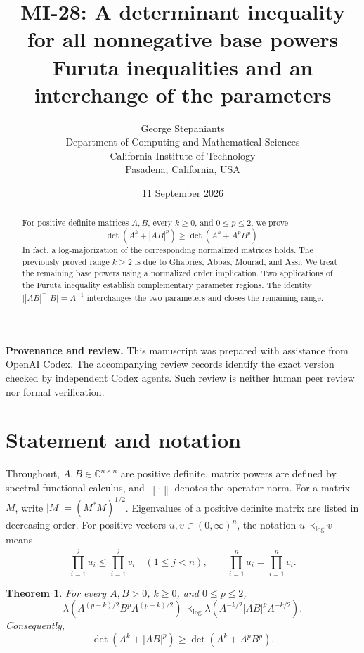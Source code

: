 \documentclass[11pt,a4paper]{article}
\title{\textbf{MI-28: A determinant inequality\\
for all nonnegative base powers}\\[0.4em]
\large Furuta inequalities and an interchange of the parameters}
\author{George Stepaniants\\[0.3em]
\small Department of Computing and Mathematical Sciences\\
\small California Institute of Technology\\
\small Pasadena, California, USA}
\date{11 September 2026}
\newtheorem{theorem}{Theorem}
\theoremstyle{remark}
\newcommand{\norm}[1]{\left\lVert #1\right\rVert}
\newcommand{\lm}{\prec_{\log}}
\newcommand{\C}{\mathbb C}
\begin{document}
\maketitle

\begin{abstract}
For positive definite matrices \(A,B\), every \(k\ge0\), and
\(0\le p\le2\), we prove
\[
 \det(A^k+|AB|^p)\ge\det(A^k+A^pB^p).
\]
In fact, a log-majorization of the corresponding normalized matrices
holds. The previously proved range \(k\ge2\) is due to
Ghabries, Abbas, Mourad, and Assi. We treat the remaining base powers
using a normalized order implication. Two applications of the Furuta
inequality establish complementary parameter regions. The identity
\(\lvert |AB|^{-1}B\rvert=A^{-1}\) interchanges the two parameters
and closes the remaining range.
\end{abstract}

\noindent\textbf{Provenance and review.}
This manuscript was prepared with assistance from OpenAI Codex.
The accompanying review records identify the exact version checked
by independent Codex agents. Such review is neither human peer review
nor formal verification.

\section{Statement and notation}

Throughout, \(A,B\in\C^{n\times n}\) are positive definite,
matrix powers are defined by spectral functional calculus, and
\(\norm{\cdot}\) denotes the operator norm.
For a matrix \(M\), write \(|M|=(M^*M)^{1/2}\).
Eigenvalues of a positive definite matrix are listed in decreasing order.
For positive vectors \(u,v\in(0,\infty)^n\), the notation
\(u\lm v\) means
\[
 \prod_{i=1}^j u_i\le\prod_{i=1}^j v_i\quad(1\le j<n),
 \qquad
 \prod_{i=1}^n u_i=\prod_{i=1}^n v_i .
\]

\begin{theorem}\label{thm:main}
For every \(A,B>0\), \(k\ge0\), and \(0\le p\le2\),
\begin{equation}\label{eq:mainlog}
 \lambda\!\left(A^{(p-k)/2}B^pA^{(p-k)/2}\right)
 \lm
 \lambda\!\left(A^{-k/2}|AB|^pA^{-k/2}\right).
\end{equation}
Consequently,
\begin{equation}\label{eq:maindet}
 \det(A^k+|AB|^p)\ge\det(A^k+A^pB^p).
\end{equation}
\end{theorem}
\end{document}
